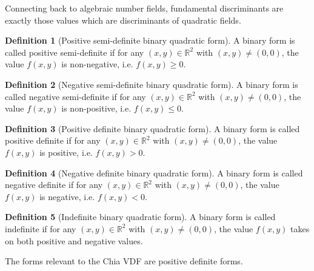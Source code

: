 \documentclass{article}
\theoremstyle{definition}
\newtheorem{definition}{Definition}[section]
\theoremstyle{theorem}
\theoremstyle{example}
\theoremstyle{corollary}
\begin{document}
\bigskip

Connecting back to algebraic number fields, fundamental discriminants are exactly those values which are discriminants of quadratic fields.

\bigskip

\theoremstyle{definition}
\begin{definition}[Positive semi-definite binary quadratic form]
A binary form is called positive semi-definite if for any \((x, y) \in \mathbb{R}^{2}\) with \((x, y) \ne (0, 0)\), the value \(f(x, y)\) is non-negative, i.e. \(f(x, y) \ge 0\).
\end{definition}

\bigskip

\theoremstyle{definition}
\begin{definition}[Negative semi-definite binary quadratic form]
A binary form is called negative semi-definite if for any \((x, y) \in \mathbb{R}^{2}\) with \((x, y) \ne (0, 0)\), the value \(f(x, y)\) is non-positive, i.e. \(f(x, y) \le 0\).
\end{definition}

\bigskip 

\theoremstyle{definition}
\begin{definition}[Positive definite binary quadratic form]
A binary form is called positive definite if for any \((x, y) \in \mathbb{R}^{2}\) with \((x, y) \ne (0, 0)\), the value \(f(x, y)\) is positive, i.e. \(f(x, y) > 0\).
\end{definition}

\bigskip

\theoremstyle{definition}
\begin{definition}[Negative definite binary quadratic form]
A binary form is called negative definite if for any \((x, y) \in \mathbb{R}^{2}\) with \((x, y) \ne (0, 0)\), the value \(f(x, y)\) is negative, i.e. \(f(x, y) < 0\).
\end{definition}

\bigskip

\theoremstyle{definition}
\begin{definition}[Indefinite binary quadratic form]
A binary form is called indefinite if for any \((x, y) \in \mathbb{R}^{2}\) with \((x, y) \ne (0, 0)\), the value \(f(x, y)\) takes on both positive and negative values.
\end{definition}

\bigskip

The forms relevant to the Chia VDF are positive definite forms.
\end{document}
